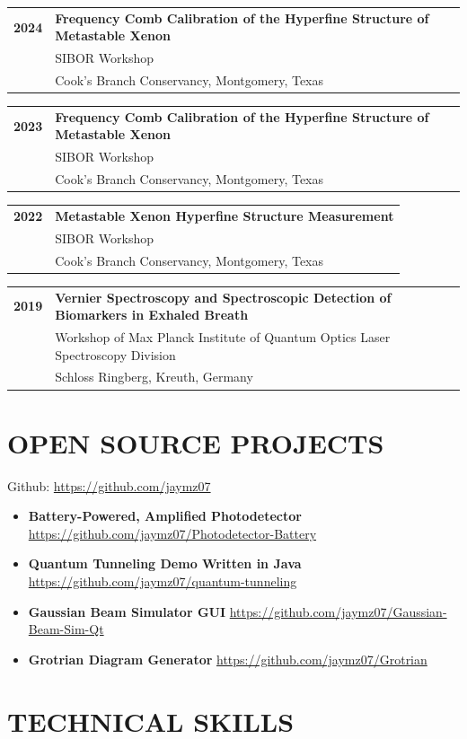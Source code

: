 \documentclass[a4paper,9pt]{extarticle}
\makeatletter
\newcommand{\cventryy}[4]{
	\noindent
	\begin{tabular*}{\textwidth}{@{\extracolsep{\fill}}p{0.6cm}p{14.7cm}}
		\textbf{#1} &
		\textbf{#2}\\
		&
		#3\\
		&
		#4\\[0.8em]
	\end{tabular*}
}
\makeatother
\begin{document}
	\cventryy
	{2024}
	{Frequency Comb Calibration of the Hyperfine Structure of Metastable Xenon}
	{SIBOR Workshop}
	{Cook's Branch Conservancy, Montgomery, Texas}
	
	\cventryy
	{2023}
	{Frequency Comb Calibration of the Hyperfine Structure of Metastable Xenon}
	{SIBOR Workshop}
	{Cook's Branch Conservancy, Montgomery, Texas}
	
	\cventryy
	{2022}
	{Metastable Xenon Hyperfine Structure Measurement}
	{SIBOR Workshop}
	{Cook's Branch Conservancy, Montgomery, Texas}
	
	\cventryy
	{2019}
	{Vernier Spectroscopy and Spectroscopic Detection of Biomarkers in Exhaled Breath}
	{Workshop of Max Planck Institute of Quantum Optics Laser Spectroscopy Division}
	{Schloss Ringberg, Kreuth, Germany}
	
	\section*{OPEN SOURCE PROJECTS}
	
	Github: \url{https://github.com/jaymz07}
	
	\begin{itemize}
		\item \textbf{Battery-Powered, Amplified Photodetector} \newline
			\null\qquad \url{https://github.com/jaymz07/Photodetector-Battery}
			
		\item \textbf{Quantum Tunneling Demo Written in Java} \newline
		\null\qquad \url{https://github.com/jaymz07/quantum-tunneling}
		
		\item \textbf{Gaussian Beam Simulator GUI} \newline
		\null\qquad \url{https://github.com/jaymz07/Gaussian-Beam-Sim-Qt}
		
		\item \textbf{Grotrian Diagram Generator} \newline
		\null\qquad \url{https://github.com/jaymz07/Grotrian}
	\end{itemize}
	
	\section*{TECHNICAL SKILLS}
	
\end{document}
